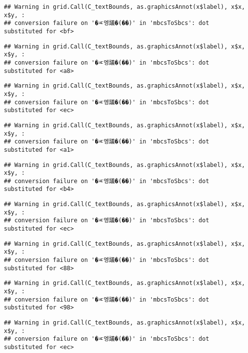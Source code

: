 \documentclass[
]{article}
\begin{document}
\begin{verbatim}
## Warning in grid.Call(C_textBounds, as.graphicsAnnot(x$label), x$x, x$y, :
## conversion failure on '�ㅼ엥議�(��)' in 'mbcsToSbcs': dot substituted for <bf>
\end{verbatim}

\begin{verbatim}
## Warning in grid.Call(C_textBounds, as.graphicsAnnot(x$label), x$x, x$y, :
## conversion failure on '�ㅼ엥議�(��)' in 'mbcsToSbcs': dot substituted for <a8>
\end{verbatim}

\begin{verbatim}
## Warning in grid.Call(C_textBounds, as.graphicsAnnot(x$label), x$x, x$y, :
## conversion failure on '�ㅼ엥議�(��)' in 'mbcsToSbcs': dot substituted for <ec>
\end{verbatim}

\begin{verbatim}
## Warning in grid.Call(C_textBounds, as.graphicsAnnot(x$label), x$x, x$y, :
## conversion failure on '�ㅼ엥議�(��)' in 'mbcsToSbcs': dot substituted for <a1>
\end{verbatim}

\begin{verbatim}
## Warning in grid.Call(C_textBounds, as.graphicsAnnot(x$label), x$x, x$y, :
## conversion failure on '�ㅼ엥議�(��)' in 'mbcsToSbcs': dot substituted for <b4>
\end{verbatim}

\begin{verbatim}
## Warning in grid.Call(C_textBounds, as.graphicsAnnot(x$label), x$x, x$y, :
## conversion failure on '�ㅼ엥議�(��)' in 'mbcsToSbcs': dot substituted for <ec>
\end{verbatim}

\begin{verbatim}
## Warning in grid.Call(C_textBounds, as.graphicsAnnot(x$label), x$x, x$y, :
## conversion failure on '�ㅼ엥議�(��)' in 'mbcsToSbcs': dot substituted for <88>
\end{verbatim}

\begin{verbatim}
## Warning in grid.Call(C_textBounds, as.graphicsAnnot(x$label), x$x, x$y, :
## conversion failure on '�ㅼ엥議�(��)' in 'mbcsToSbcs': dot substituted for <98>
\end{verbatim}

\begin{verbatim}
## Warning in grid.Call(C_textBounds, as.graphicsAnnot(x$label), x$x, x$y, :
## conversion failure on '�ㅼ엥議�(��)' in 'mbcsToSbcs': dot substituted for <ec>
\end{verbatim}
\end{document}

